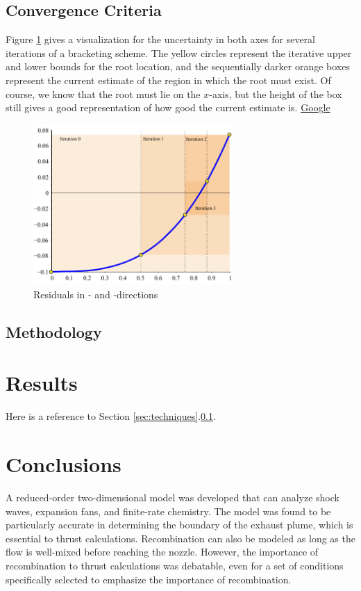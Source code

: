 \documentclass[journal]{../aiaa-pretty}
\begin{document}
\subsection{Convergence Criteria} \label{ssec:criteria}
Figure \ref{fig:f:tol} gives a visualization for the uncertainty in both axes for several iterations of a bracketing scheme.  The yellow circles represent the iterative upper and lower bounds for the root location, and the sequentially darker orange boxes represent the current estimate of the region in which the root must exist.  Of course, we know that the root must lie on the $x$-axis, but the height of the box still gives a good representation of how good the current estimate is.  \href{http://www.google.com}{Google}

\begin{figure}
 \centering
 \includegraphics[width=3in]{./pics/f1_tol.pdf}
 \caption{ \label{fig:f:tol}
  Residuals in - and -directions}
\end{figure}


\subsection{Methodology}



\section{Results}
Here is a reference to Section \ref{sec:techniques}.\ref{ssec:criteria}.


\section{Conclusions}                            \label{sec:conclusion}
A reduced-order two-dimensional model was developed that can analyze shock waves, expansion fans, and finite-rate chemistry.  The model was found to be particularly accurate in determining the boundary of the exhaust plume, which is essential to thrust calculations.  Recombination can also be modeled as long as the flow is well-mixed before reaching the nozzle.  However, the importance of recombination to thrust calculations was debatable, even for a set of conditions specifically selected to emphasize the importance of recombination.
\end{document}
